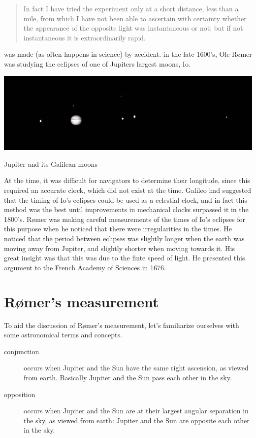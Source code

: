 \documentclass{tufte-handout}
\begin{document}
\begin{quote}
In fact I have tried the experiment only at a short distance, less than a mile, from which I have not been able to ascertain with certainty whether the appearance of the opposite light was instantaneous or not; but if not instantaneous it is extraordinarily rapid.
\end{quote}

 was made (as often happens in science) by accident.  in the late 1600's, Ole R{\o}mer was studying the eclipses of one of Jupiters largest moons, Io.
\begin{marginfigure}
\includegraphics{Romer2.jpg}
\caption{Jupiter and its Galilean moons}
\end{marginfigure}
At the time, it was difficult for navigators to determine their longitude, since this required an accurate clock, which did not exist at the time.  Galileo had suggested that the timing of Io's eclipses could be used as a celestial clock, and in fact this method was the best until improvements in mechanical clocks surpassed it in the 1800's.  R{\o}mer was making careful measurements of the times of Io's eclipses for this purpose when he noticed that there were irregularities in the times.  He noticed that the period between eclipses was slightly longer when the earth was moving away from Jupiter, and slightly shorter when moving towards it.
 His great insight was that this was due to the finte speed of light.  He presented this argument to the French Academy of Sciences in 1676.

\section{R{\o}mer's measurement}

To aid the discussion of R{\o}mer's measurement, let's familiarize ourselves with some astronomical terms and concepts.
\begin{description}
\item[conjunction] occurs when Jupiter and the Sun have the same right ascension, as viewed from earth.  Basically Jupiter and the Sun pass each other in the sky.
\item[opposition] occurs when Jupiter and the Sun are at their largest angular separation in the sky, as viewed from earth: Jupiter and the Sun are opposite each other in the sky. 
\end{description}
\end{document}
